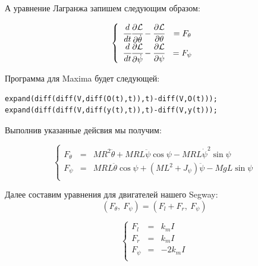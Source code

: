 \documentclass[12pt,a4paper,openany]{extarticle}
\begin{document}
А уравнение Лагранжа запишем следующим образом:

\begin{equation}
\left\{  
	\begin{array}{rcl} 
	\cfrac{d}{dt}\cfrac{\partial \mathcal{L}}{\partial\dot{\theta}}-\cfrac{\partial \mathcal{L}}{\partial 			\theta}&=F_\theta\\
	\cfrac{d}{dt}\cfrac{\partial \mathcal{L}}{\partial\dot{\psi}}-\cfrac{\partial \mathcal{L}}{\partial \psi}&=F_\psi\\
	\end{array}   
	\right.
\end{equation}


Программа для Maxima будет следующей:

\begin{lstlisting}
expand(diff(diff(V,diff(O(t),t)),t)-diff(V,O(t)));
expand(diff(diff(V,diff(y(t),t)),t)-diff(V,y(t)));
\end{lstlisting}


Выполнив указанные дейсвия мы получим:

\begin{equation}
\left\{  
	\begin{array}{rcl}
	F_\theta&=&MR^2\ddot\theta+MRL\ddot\psi\cos\psi-MRL\dot\psi^2\sin\psi\\
	F_\psi&=&MRL\ddot\theta\cos\psi+(ML^2+J_\psi)\ddot\psi-MgL\sin\psi\\
	\end{array}   
	\right.
\end{equation}

Далее составим уравнения для двигателей нашего Segway:
\begin{equation}
(F_\theta,\ F_\psi)=\left(F_l+F_r,\ F_\psi\right)
\end{equation}

\begin{equation}
\left\{  
	\begin{array}{rcl}
	F_l&=&k_mI\\
	F_r&=&k_mI\\
	F_\psi&=&-2k_mI\\	
	\end{array}   
	\right.
\end{equation}
\end{document}
